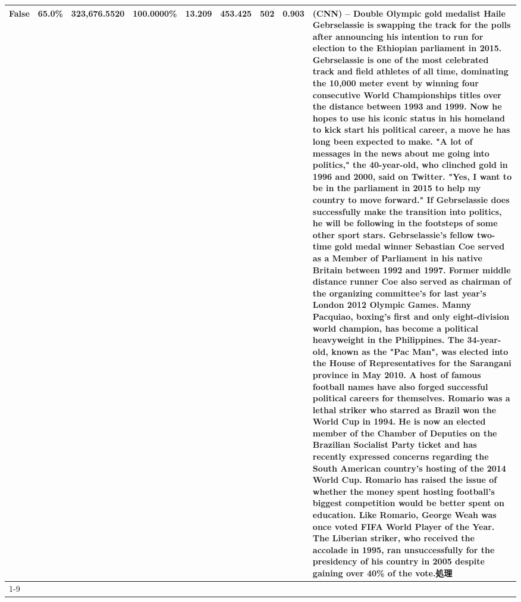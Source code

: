 \begin{table}[H]
{\begin{tabular}{lllrlllll}
False & 65.0\% & 323,676.5520 & \bfseries \color{red} 100.0000\% & 13.209 & 453.425 & 502 & 0.903 & (CNN) -- Double Olympic gold medalist Haile Gebrselassie is swapping the track for the polls after announcing his intention to run for election to the Ethiopian parliament in 2015. Gebrselassie is one of the most celebrated track and field athletes of all time, dominating the 10,000 meter event by winning four consecutive World Championships titles over the distance between 1993 and 1999. Now he hopes to use his iconic status in his homeland to kick start his political career, a move he has long been expected to make. "A lot of messages in the news about me going into politics," the 40-year-old, who clinched gold in 1996 and 2000, said on Twitter. "Yes, I want to be in the parliament in 2015 to help my country to move forward." If Gebrselassie does successfully make the transition into politics, he will be following in the footsteps of some other sport stars. Gebrselassie's fellow two-time gold medal winner Sebastian Coe served as a Member of Parliament in his native Britain between 1992 and 1997. Former middle distance runner Coe also served as chairman of the organizing committee's for last year's London 2012 Olympic Games. Manny Pacquiao, boxing's first and only eight-division world champion, has become a political heavyweight in the Philippines. The 34-year-old, known as the "Pac Man", was elected into the House of Representatives for the Sarangani province in May 2010. A host of famous football names have also forged successful political careers for themselves. Romario was a lethal striker who starred as Brazil won the World Cup in 1994. He is now an elected member of the Chamber of Deputies on the Brazilian Socialist Party ticket and has recently expressed concerns regarding the South American country's hosting of the 2014 World Cup. Romario has raised the issue of whether the money spent hosting football's biggest competition would be better spent on education. Like Romario, George Weah was once voted FIFA World Player of the Year. The Liberian striker, who received the accolade in 1995, ran unsuccessfully for the presidency of his country in 2005 despite gaining over 40\% of the vote.処理 \\
\cline{1-9}

\end{tabular}}
\end{table}
